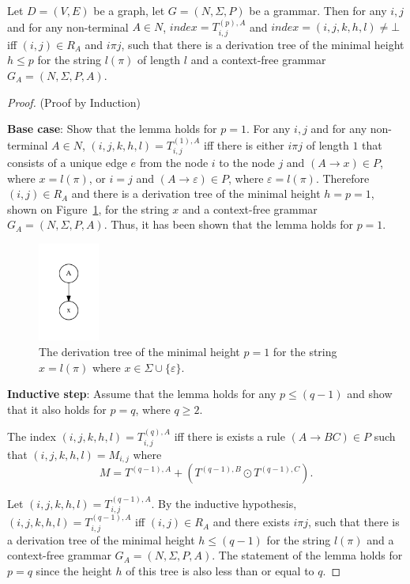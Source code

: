 \begin{lemma}\label{lemma:correctness}
	Let $D = (V,E)$ be a graph, let $G =(N,\Sigma,P)$ be a grammar. Then for any $i, j$ and for any non-terminal $A \in N$, $index = T^{(p),A}_{i,j}$ and $index = (i,j,k,h,l) \neq \bot$ iff $(i,j) \in R_A$ and $i \pi j$, such that there is a derivation tree of the minimal height $h \leq p$ for the string $l(\pi)$  of length $l$ and a context-free grammar $G_A = (N,\Sigma,P,A)$.
\end{lemma}
\begin{proof}(Proof by Induction)
	
	\textbf{Base case}: Show that the lemma holds for $p = 1$. For any $i, j$ and for any non-terminal $A \in N$, $(i,j,k,h,l) = T^{(1), A}_{i,j}$ iff there is either $i \pi j$ of length $1$ that consists of a unique edge $e$ from the node $i$ to the node $j$ and $(A \rightarrow x) \in P$, where $x = l(\pi)$, or $i = j$ and $(A \rightarrow \varepsilon) \in P$, where $\varepsilon = l(\pi)$. Therefore $(i,j) \in R_A$ and there is a derivation tree of the minimal height $h = p = 1$, shown on Figure~\ref{tree1}, for the string $x$ and a context-free grammar $G_A = (N,\Sigma,P,A)$. Thus, it has been shown that the lemma holds for $p = 1$.
	
	\begin{figure}[h!]
		\centering
		\includegraphics[width=2cm]{pictures/tree1.pdf}
		\caption{The derivation tree of the minimal height $p = 1$ for the string $x = l(\pi)$ where $x \in \Sigma \cup \{\varepsilon\}$.}
		\label{tree1}
	\end{figure}
	
	\textbf{Inductive step}: Assume that the lemma holds for any $p \leq (q - 1)$ and show that it also holds for $p = q$, where $q \geq 2$.
	
	The index $(i,j,k,h,l) = T^{(q),A}_{i,j}$ iff there is exists a rule $(A \to B C) \in P$ such that $(i,j,k,h,l) = M_{i,j}$ where $$M = T^{(q-1),A} + (T^{(q-1),B} \odot T^{(q-1),C}).$$ 
	
	Let $(i,j,k,h,l) = T^{(q-1),A}_{i,j}$. By the inductive hypothesis,\\ $(i,j,k,h,l) = T^{(q-1),A}_{i,j}$ iff $(i,j) \in R_A$ and there exists $i \pi j$, such that there is a derivation tree of the minimal height $h \leq (q-1)$ for the string $l(\pi)$ and a context-free grammar $G_A = (N,\Sigma,P,A)$. The statement of the lemma holds for $p = q$ since the height $h$ of this tree is also less than or equal to $q$.
	

\end{proof}

